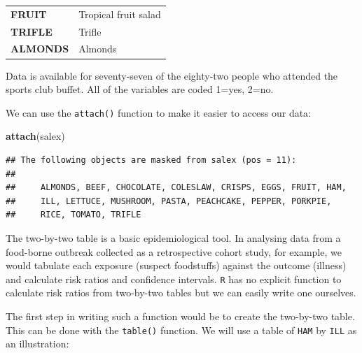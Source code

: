 \documentclass[12pt,]{book}
\newenvironment{Shaded}{\begin{snugshade}}{\end{snugshade}}
\newcommand{\KeywordTok}[1]{\textcolor[rgb]{0.13,0.29,0.53}{\textbf{#1}}}
\newcommand{\NormalTok}[1]{#1}
\theoremstyle{definition}
\theoremstyle{definition}
\theoremstyle{definition}
\theoremstyle{remark}
\begin{document}
\begin{longtable}[]{@{}ll@{}}
\begin{minipage}[t]{0.21\columnwidth}\raggedright
\textbf{FRUIT}\strut
\end{minipage} & \begin{minipage}[t]{0.30\columnwidth}\raggedright
Tropical fruit salad\strut
\end{minipage}\tabularnewline
\begin{minipage}[t]{0.21\columnwidth}\raggedright
\textbf{TRIFLE}\strut
\end{minipage} & \begin{minipage}[t]{0.30\columnwidth}\raggedright
Trifle\strut
\end{minipage}\tabularnewline
\begin{minipage}[t]{0.21\columnwidth}\raggedright
\textbf{ALMONDS}\strut
\end{minipage} & \begin{minipage}[t]{0.30\columnwidth}\raggedright
Almonds\strut
\end{minipage}\tabularnewline
\bottomrule
\end{longtable}

Data is available for seventy-seven of the eighty-two people who
attended the sports club buffet. All of the variables are coded 1=yes,
2=no.

We can use the \texttt{attach()} function to make it easier to access
our data:

\begin{Shaded}
\begin{Highlighting}[]
\KeywordTok{attach}\NormalTok{(salex)}
\end{Highlighting}
\end{Shaded}

\begin{verbatim}
## The following objects are masked from salex (pos = 11):
## 
##     ALMONDS, BEEF, CHOCOLATE, COLESLAW, CRISPS, EGGS, FRUIT, HAM,
##     ILL, LETTUCE, MUSHROOM, PASTA, PEACHCAKE, PEPPER, PORKPIE,
##     RICE, TOMATO, TRIFLE
\end{verbatim}

The two-by-two table is a basic epidemiological tool. In analysing data
from a food-borne outbreak collected as a retrospective cohort study,
for example, we would tabulate each exposure (suspect foodstuffs)
against the outcome (illness) and calculate risk ratios and confidence
intervals. \texttt{R} has no explicit function to calculate risk ratios
from two-by-two tables but we can easily write one ourselves.

The first step in writing such a function would be to create the
two-by-two table. This can be done with the \texttt{table()} function.
We will use a table of \texttt{HAM} by \texttt{ILL} as an illustration:
\end{document}
